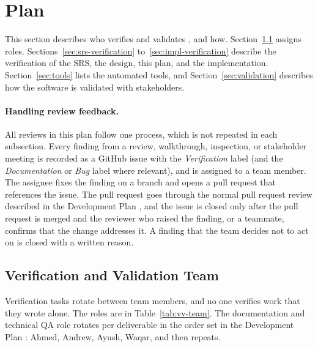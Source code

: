 \documentclass[12pt, titlepage]{article}
\begin{document}
\section{Plan}
\label{sec:plan}

  This section describes who verifies and validates \projname{}, and how. Section~\ref{sec:team} assigns
  roles. Sections~\ref{sec:srs-verification} to~\ref{sec:impl-verification} describe the verification of the SRS, the
  design, this plan, and the implementation. Section~\ref{sec:tools} lists the automated tools, and
  Section~\ref{sec:validation} describes how the software is validated with stakeholders.

  \paragraph{Handling review feedback.} All reviews in this plan follow one process, which is not repeated in each subsection.
  Every finding from a review, walkthrough, inspection, or stakeholder meeting is recorded as a GitHub issue with the
  \emph{Verification} label (and the \emph{Documentation} or \emph{Bug} label where relevant), and is assigned to a team
  member.
  The assignee fixes the finding on a branch and opens a pull request that references the issue. The pull request goes through the
  normal pull request review described in the Development Plan \citep{DevelopmentPlan}, and the issue is closed only after the pull
  request is merged and the reviewer who raised the finding, or a teammate, confirms that the change addresses it.
  A finding that the team decides not to act on is closed with a written reason.

  \subsection{Verification and Validation Team}
  \label{sec:team}

  Verification tasks rotate between team members, and no one verifies work that they wrote alone. The roles are in
  Table~\ref{tab:vv-team}. The documentation and technical QA role rotates per deliverable in the order set in the
  Development Plan \citep{DevelopmentPlan}: Ahmed, Andrew, Ayush, Waqar, and then repeats.
\end{document}
